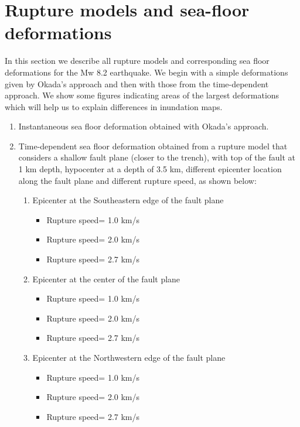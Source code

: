\documentclass[preprint,review,12pt]{elsarticle}
\begin{document}
 

\section{Rupture models and sea-floor deformations}

In this section we describe all rupture models and corresponding sea floor deformations for the Mw 8.2 earthquake. We begin with a simple deformations given by Okada's approach and then with those from the time-dependent approach. We show some figures indicating areas of the largest deformations which will help us to explain differences in inundation maps.

\begin{enumerate}
  \item Instantaneous sea floor deformation obtained with Okada's approach.
  \item Time-dependent sea floor deformation obtained from a rupture model that considers a shallow fault plane (closer to the trench), with top of the fault at 1 km depth, hypocenter at a depth of 3.5 km, different epicenter location along the fault plane and different rupture speed, as shown below:

  \begin{enumerate}
    \item Epicenter at the Southeastern edge of the fault plane
    \begin{itemize}
      \item Rupture speed= 1.0 km/s 
      \item Rupture speed= 2.0 km/s 
      \item Rupture speed= 2.7 km/s 
    \end{itemize}

    \item Epicenter at the center of the fault plane
    \begin{itemize}
      \item Rupture speed= 1.0 km/s 
      \item Rupture speed= 2.0 km/s 
      \item Rupture speed= 2.7 km/s 
    \end{itemize}

    \item Epicenter at the Northwestern edge of the fault plane
    \begin{itemize}
      \item Rupture speed= 1.0 km/s 
      \item Rupture speed= 2.0 km/s 
      \item Rupture speed= 2.7 km/s 
    \end{itemize}
\end{enumerate}


\end{enumerate}
\end{document}

